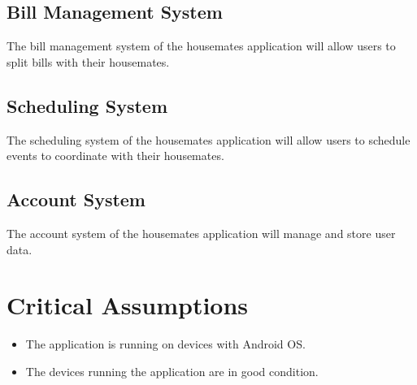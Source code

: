 \documentclass{article}
\begin{document}
\subsection{Bill Management System}
The bill management system of the housemates application will allow users to split bills with their housemates.

\subsection{Scheduling System}
The scheduling system of the housemates application will allow users to schedule events to coordinate with their housemates.

\subsection{Account System}
The account system of the housemates application will manage and store user data.

\section{Critical Assumptions}

\begin{itemize}
    \item The application is running on devices with Android OS.
    \item The devices running the application are in good condition.
\end{itemize}

\end{document}
